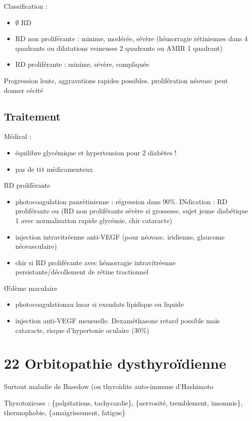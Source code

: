 \documentclass[11pt]{article}
\begin{document}
Classification :
\begin{itemize}
\item \(\emptyset\) RD
\item RD non proliférante : minime, modérée, sévère (hémorragie rétiniennes dans 4
quadrants ou dilatations veineuses 2 quadrants ou AMIR 1 quadrant)
\item RD proliférante : minime, sévère, compliquée
\end{itemize}

Progression lente, aggravations rapides possibles. \danger prolifération néovasc
peut donner cécité 

\subsection{Traitement}
\label{sec:org6e2e5a8}
Médical :
\begin{itemize}
\item équilibre glycémique et hypertension pour 2 diabètes !
\item pas de ttt médicamenteux
\end{itemize}
RD proliférante 
\begin{itemize}
\item photocoagulation panrétinienne : régression dans 90\%. INdication : RD
proliférante ou (RD non proliférante sévère si grossesse, sujet jeune
diabétique 1 avec normalisation rapide glycémie, chir cataracte)
\item injection intravitréenne anti-VEGF (pour néovasc. iridienne, glaucome
néovasculaire)
\item chir si RD proliférante avec hémorragie intravitréenne persistante/décollement
de rétine tractionnel
\end{itemize}
\OE{}dème maculaire 
\begin{itemize}
\item photocoagulationau lasar si exsudats lipidique ou liquide
\item injection anti-VEGF mensuelle. Dexaméthasone retard possible mais cataracte,
risque d'hypertonie oculaire (30\%)
\end{itemize}
\section{22 Orbitopathie dysthyroïdienne}
\label{sec:org54cafdc}
Surtout maladie de Basedow (ou thyroïdite auto-immune d'Hashimoto

Thyrotoxicose : \{palpitations, tachycardie\}, \{nervosité, tremblement, insomnie\},
thermophobie, \{amaigrissement, fatigue\}
\end{document}
